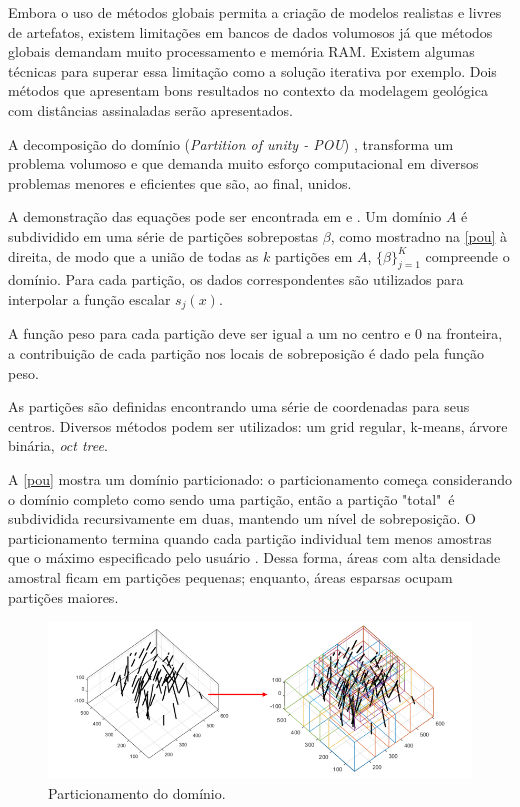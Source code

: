 Embora o uso de métodos globais permita a criação de modelos realistas e livres de artefatos, existem limitações em bancos de dados volumosos já que métodos globais demandam muito processamento e memória RAM. Existem algumas técnicas para superar essa limitação como a solução iterativa \cite{beatson1999fast} por exemplo. Dois métodos que apresentam bons resultados no contexto da modelagem geológica com distâncias assinaladas serão apresentados.

 \label{dom_decomp}

A decomposição do domínio (\textit{Partition of unity - POU}) \cite{wendland2004scattered}, transforma um problema volumoso e que demanda muito esforço computacional em diversos problemas menores e eficientes que são, ao final, unidos.

A demonstração das equações pode ser encontrada em  e . Um domínio $A$ é subdividido em uma série de partições sobrepostas $\beta$, como mostradno na \autoref{pou} à direita, de modo que a união de todas as $k$ partições em $A$, $\{ \beta \}^K_{j=1}$ compreende o domínio. Para cada partição, os dados correspondentes são utilizados para interpolar a função escalar $s_j(x)$.

A função peso para cada partição deve ser igual a um no centro e 0 na fronteira, a contribuição de cada partição nos locais de sobreposição é dado pela função peso.

As partições são definidas encontrando uma série de coordenadas para seus centros. Diversos métodos podem ser utilizados: um grid regular, k-means, árvore binária, \textit{oct tree}.

A \autoref{pou} mostra um domínio particionado: o particionamento começa considerando o domínio completo como sendo uma partição, então a partição "total"\ é subdividida recursivamente em duas, mantendo um nível de sobreposição. O particionamento termina quando cada partição individual tem menos amostras que o máximo especificado pelo usuário \cite{martin2017implicitmodeling, martin2017iterative}. Dessa forma, áreas com alta densidade amostral ficam em partições pequenas; enquanto, áreas esparsas ocupam partições maiores.

\begin{figure}[H]
	\caption{\label{pou}Particionamento do domínio.}
	\centering
		\includegraphics[width=\textwidth]{capitulo_2/imagens/pou.jpg}
\end{figure}

